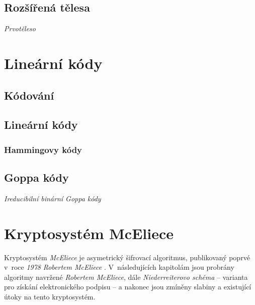\documentclass[thesis=M,czech,hidelinks]{FITthesis}[2012/06/26]
\newcommand{\0}{{\textcolor[gray]{0.80}{0}}}
\begin{document}
\section{Rozšířená tělesa}

\emph{Prvotěleso}





\chapter{Lineární kódy}\label{kap_kody}

\section{Kódování}

\section{Lineární kódy}
\subsection{Hammingovy kódy}

\section{Goppa kódy}
\emph{Ireducibilní binární Goppa kódy}





\chapter{Kryptosystém McEliece}\label{kap_mceliece}
Kryptosystém \emph{McEliece} je asymetrický šifrovací algoritmus, publikovaný
poprvé v~roce \emph{1978} \emph{Robertem McEliece} \cite{McEliece}.
V~následujících kapitolám jsou probrány algoritmy navržené \emph{Robertem
McEliece}, dále \emph{Niederreiterovo schéma} -- varianta pro získání
elektronického podpisu -- a nakonec jsou zmíněny slabiny a existující útoky na
tento kryptosystém.
\end{document}
